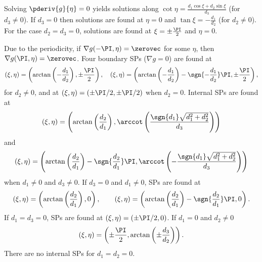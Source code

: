 Solving $\pderiv{g}{\eta}=0$ yields solutions along $\cot\eta = \frac{d_1\cos\xi+d_2\sin\xi}{d_3}$ (for $d_3\neq 0$). If $d_3=0$ then solutions are found at $\eta=0$ and $\tan\xi=-\frac{d_1}{d_2}$ (for $d_2\neq 0$). For the case $d_2=d_3=0$, solutions are found at $\xi=\pm\frac{\PI}{2}$ and $\eta=0$.

Due to the periodicity, if $\nabla g(-\PI,\eta)=\zerovec$ for some $\eta$, then $\nabla g(\PI,\eta)=\zerovec$. Four boundary SPs ($\nabla g=0$) are found at 
\begin{equation*}
	(\xi,\eta) = \left(\arctan\left(-\frac{d_1}{d_2}\right),\pm\frac{\PI}{2}\right),\quad (\xi,\eta) = \left(\arctan\left(-\frac{d_1}{d_2}\right)-\sgn{-\frac{d_1}{d_2}}\PI,\pm\frac{\PI}{2}\right),
\end{equation*}
for $d_2\neq 0$, and at $(\xi,\eta) = (\pm\PI/2,\pm\PI/2)$ when $d_2=0$. Internal SPs are found at
\begin{equation*}
	(\xi,\eta) = \left(\arctan\left(\frac{d_2}{d_1}\right),\arccot\left(\frac{\sgn{d_1}\sqrt{d_1^2+d_2^2}}{d_3}\right)\right)
\end{equation*}
and
\begin{equation*}
	(\xi,\eta) = \left(\arctan\left(\frac{d_2}{d_1}\right)-\sgn{\frac{d_2}{d_1}}\PI,\arccot\left(-\frac{\sgn{d_1}\sqrt{d_1^2+d_2^2}}{d_3}\right)\right)
\end{equation*}
when $d_1\neq 0$ and $d_3\neq 0$. If $d_3=0$ and $d_1\neq 0$, SPs are found at 
\begin{equation*}
	(\xi,\eta) = \left(\arctan\left(\frac{d_2}{d_1}\right),0\right),\qquad (\xi,\eta) = \left(\arctan\left(\frac{d_2}{d_1}\right)-\sgn{\frac{d_2}{d_1}}\PI,0\right).
\end{equation*}
If $d_1=d_3=0$, SPs are found at $(\xi,\eta) = (\pm\PI/2, 0)$. If $d_1=0$ and $d_2\neq 0$
\begin{equation*}
	(\xi,\eta) = \left(\pm\frac{\PI}{2},\arctan\left(\pm\frac{d_3}{d_2}\right)\right).
\end{equation*}
There are no internal SPs for $d_1=d_2=0$.

